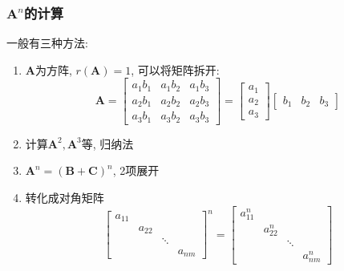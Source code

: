 \subsubsection{$ \bm{A}^{n} $的计算}
一般有三种方法:
\begin{enumerate}
\item $ \bm{A} $为方阵, $ r(\bm{A})=1 $, 可以将矩阵拆开:
\begin{equation*}
\bm{A}=
\begin{bmatrix}
a_{1}b_{1} & a_{1}b_{2} & a_{1}b_{3} \\
a_{2}b_{1} & a_{2}b_{2} & a_{2}b_{3} \\
a_{3}b_{1} & a_{3}b_{2} & a_{3}b_{3}
\end{bmatrix}=
\begin{bmatrix}
a_{1} \\
a_{2} \\
a_{3}
\end{bmatrix}
\begin{bmatrix}
b_{1} & b_{2} & b_{3}
\end{bmatrix}
\end{equation*}
\item 计算$ \bm{A}^{2},\bm{A}^{3} $等, 归纳法
\item $ \bm{A}^{n}=(\bm{B}+\bm{C})^{n}$, 2项展开
\item 转化成对角矩阵
\begin{equation*}
\begin{bmatrix}
a_{11} & & & \\
& a_{22} & & \\
& & \ddots & \\
& & & a_{nm}
\end{bmatrix}^{n}=
\begin{bmatrix}
a_{11}^{n} & & & \\
& a_{22}^{n} & & \\
& & \ddots & \\
& & & a_{nm}^{n}
\end{bmatrix}
\end{equation*}
\end{enumerate}

